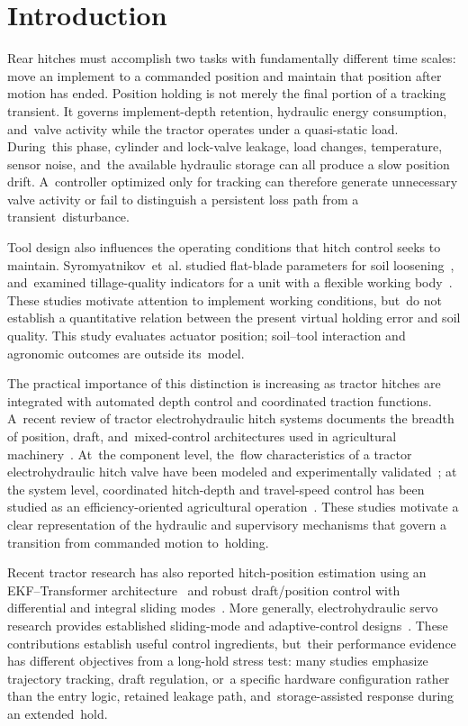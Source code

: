 \documentclass[machines,article,submit,pdftex,moreauthors]{Definitions/mdpi}
\begin{document}
\section{Introduction}
Rear hitches must accomplish two tasks with fundamentally different time scales: move an implement to a commanded position and maintain that position after motion has ended. Position holding is not merely the final portion of a tracking transient. It governs implement-depth retention, hydraulic energy consumption, and~valve activity while the tractor operates under a quasi-static load. During~this phase, cylinder and lock-valve leakage, load changes, temperature, sensor noise, and~the available hydraulic storage can all produce a slow position drift. A~controller optimized only for tracking can therefore generate unnecessary valve activity or fail to distinguish a persistent loss path from a transient~disturbance.

Tool design also influences the operating conditions that hitch control seeks to maintain. Syromyatnikov~et~al. studied flat-blade parameters for soil loosening~\cite{syromyatnikov2022}, and~examined tillage-quality indicators for a unit with a flexible working body~\cite{syromyatnikov2023}. These studies motivate attention to implement working conditions, but~do not establish a quantitative relation between the present virtual holding error and soil quality. This study evaluates actuator position; soil--tool interaction and agronomic outcomes are outside its~model.

The practical importance of this distinction is increasing as tractor hitches are integrated with automated depth control and coordinated traction functions. A~recent review of tractor electrohydraulic hitch systems documents the breadth of position, draft, and~mixed-control architectures used in agricultural machinery~\cite{sun2022}. At~the component level, the~flow characteristics of a tractor electrohydraulic hitch valve have been modeled and experimentally validated~\cite{kumar2021}; at the system level, coordinated hitch-depth and travel-speed control has been studied as an efficiency-oriented agricultural operation~\cite{sun2025}. These studies motivate a clear representation of the hydraulic and supervisory mechanisms that govern a transition from commanded motion to~holding.

Recent tractor research has also reported hitch-position estimation using an EKF--Transformer architecture~\cite{kim2025} and robust draft/position control with differential and integral sliding modes~\cite{liu2023}. More generally, electrohydraulic servo research provides established sliding-mode and adaptive-control designs~\cite{bai2010,tang2011,jin2013}. These contributions establish useful control ingredients, but~their performance evidence has different objectives from a long-hold stress test: many studies emphasize trajectory tracking, draft regulation, or~a specific hardware configuration rather than the entry logic, retained leakage path, and~storage-assisted response during an extended~hold.
\end{document}
